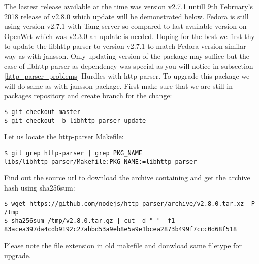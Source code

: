 The lastest release available at the time was version v2.7.1 untill 9th February's 2018 release of v2.8.0 which update will be demonstrated below.
Fedora is still using version v2.7.1 with Tang server so compared to last available version on OpenWrt which was v2.3.0 an update is needed.
Hoping for the best we first thy to update the libhttp-parser to version v2.7.1 to match Fedora version similar way as with jansson.
Only updating version of the package may suffice but the case of libhttp-parser as dependency was special as you will notice in subsection \ref{http_parser_problems} Hurdles with http-parser.
To upgrade this package we will do same as with jansson package.
First make sure that we are still in packages repository and create branch for the change:
\begin{lstlisting}[columns=fixed,basicstyle=\ttfamily\footnotesize,tabsize=4,backgroundcolor=\color{yellow!10}]
$ git checkout master
$ git checkout -b libhttp-parser-update
\end{lstlisting}
Let us locate the http-parser Makefile:
\begin{lstlisting}[columns=fixed,basicstyle=\ttfamily\footnotesize,tabsize=4,backgroundcolor=\color{yellow!10}]
$ git grep http-parser | grep PKG_NAME
libs/libhttp-parser/Makefile:PKG_NAME:=libhttp-parser
\end{lstlisting}
Find out the source url to download the archive containing and get the archive hash using sha256sum:
\begin{lstlisting}[columns=fixed,basicstyle=\ttfamily\footnotesize,tabsize=4,backgroundcolor=\color{yellow!10}]
$ wget https://github.com/nodejs/http-parser/archive/v2.8.0.tar.xz -P /tmp
$ sha256sum /tmp/v2.8.0.tar.gz | cut -d " " -f1
83acea397da4cdb9192c27abbd53a9eb8e5a9e1bcea2873b499f7ccc0d68f518
\end{lstlisting}
Please note the file extension in old makefile and donwload same filetype for upgrade.

